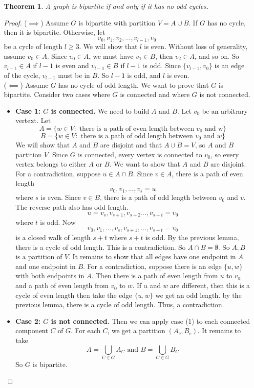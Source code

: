 \documentclass[openany]{report}
\newtheorem{theorem}{Theorem}[section]
\begin{document}
\begin{theorem}
    A graph is bipartite if and only if it has no odd cycles.
\end{theorem}
\begin{proof}
    ($\implies$) Assume $G$ is bipartite with partition $V = A \cup B$. If $G$ has no cycle, then it is bipartite. Otherwise, let 
    \[v_0, v_1, v_2, \ldots, v_{l-1}, v_0\]
    be a cycle of length $l \geq 3$. We will show that $l$ is even. Without loss of generality, assume $v_0 \in A$. Since $v_0 \in A$, we must have $v_1 \in B$, then $v_2 \in A$, and so on. So $v_{l-1} \in A$ if $l-1$ is even and $v_{l-1} \in B$ if $l - 1$ is odd. Since $\{v_{l-1}, v_0\}$ is an edge of the cycle, $v_{l-1}$ must be in $B$. So $l-1$ is odd, and $l$ is even.\\[2ex]
    ($\impliedby$) Assume $G$ has no cycle of odd length. We want to prove that $G$ is bipartite. Consider two cases where $G$ is connected and where $G$ is not connected. 
    \begin{itemize}
        \item \textbf{Case 1: $G$ is connected.} We need to build $A$ and $B$. Let $v_0$ be an arbitrary vertext. Let 
        \[A = \{w \in V : \text{ there is a path of even length between $v_0$ and w}\}\]
        \[B = \{w \in V : \text { there is a path of odd length between $v_0$ and $w$}\}\]
        We will show that $A$ and $B$ are disjoint and that $A \cup B = V$, so $A$ and $B$ partition $V$. Since $G$ is connected, every vertex is connected to $v_0$, so every vertex belongs to either $A$ or $B$. We want to show that $A$ and $B$ are disjoint. For a contradiction, suppose $u \in A \cap B$. Since $v \in A$, there is a path of even length 
        \[v_0, v_1, \ldots, v_s = u\]
        where $s$ is even. Since $v \in B$, there is a path of odd length between $v_0$ and $v$. The reverse path also has odd length. 
        \[u = v_s, v_{s+1},v_{s+2} \ldots, v_{s+t} = v_0\]
        where $t$ is odd. Now 
        \[v_0, v_1, \ldots, v_s, v_{s+1}, \ldots, v_{s+t} = v_0\]
        is a closed walk of length $s + t$ where $s + t$ is odd. By the previous lemma, there is a cycle of odd length. This is a contradiction. So $A \cap B = \emptyset$. So $A,B$ is a partition of $V$. It remains to show that all edges have one endpoint in $A$ and one endpoint in $B$. For a contradiction, suppose there is an edge $\{u,w\}$ with both endpoints in $A$. Then there is a path of even length from $u$ to $v_0$ and a path of even length from $v_0$ to $w$. If $u$ and $w$ are different, then this is a cycle of even length then take the edge $\{u,w\}$ we get an odd length. by the previous lemma, there is a cycle of odd length. Thus, a contradiction.
        \item \textbf{Case 2: $G$ is not connected.} Then we can apply case (1) to each connected component $C$ of $G$. For each $C$, we get a partition $(A_c, B_c)$. It remains to take 
        \[A = \bigcup_{C \in G} A_C \text{  and  } B = \bigcup_{C \in G} B_C\]
        So $G$ is bipartite.
    \end{itemize}
\end{proof}
\end{document}
